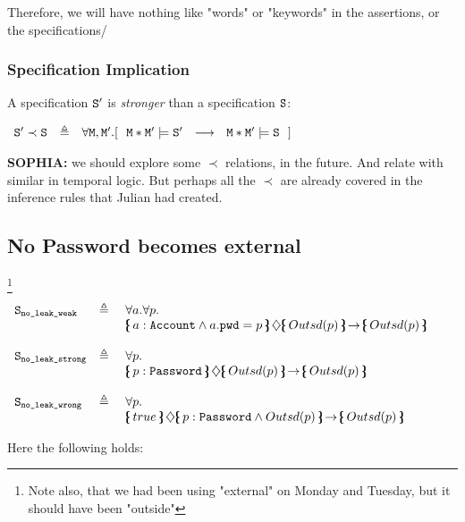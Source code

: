 Therefore, we will have nothing like "words" or "keywords" in the assertions, or the specifications/

\subsubsection{Specification Implication}


\begin{definition}
A specification ${\texttt{S}}{'}$ is \emph{stronger} than a specification ${\texttt{S}}{}$:

$\begin{array}{lll}
 \SpecB{'}\prec \SpecB{} & \triangleq &  
 \forall  \Mod,\Mod'. [\ \  \Mod*\Mod'\models \SpecB{'} \ \ \longrightarrow\ \   \Mod*\Mod' \models \SpecB{}\ \ ]
  \end{array}
$

\end{definition}

\textbf{SOPHIA:} we should explore some $\prec$ relations, in the future. And relate with similar in temporal logic. But perhaps all the $\prec$ are already covered in the inference rules that Julian had created.

\subsection{No Password becomes external}\footnote{Note also, that we had been using "external" on Monday and Tuesday, but it should have been "outside"}

$\begin{array}{lll}
 \Spec{no\_leak\_weak} & \triangleq &  \forall a.  \forall p.\\
 & &   \onlyIf{a:\prg{Account}\wedge a.\prg{pwd}=p}{\outside{p}} {\outside{p}}\   
~ \\
\\
 \Spec{no\_leak\_strong} & \triangleq &  \forall p.\\
 & &   \onlyIf{p:\prg{Password}} {\outside{p}} {\outside{p}}\  \\
 ~ \\
 \Spec{no\_leak\_wrong} & \triangleq\ & \forall p. \\
 & &    \onlyIf{true} {p:\prg{Password} \wedge \outside{p}} {\outside{p}} 

\end{array}
$

\vspace{.1in}
\noindent
Here the following holds:

